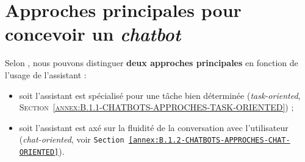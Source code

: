 	\newpage
	\section{Approches principales pour concevoir un \textit{chatbot}}
	\label{annex:B.1-ANNEXE-CHATBOTS-APPROCHES}
		
		Selon \cite{chen-etal:2017:survey-dialogue-systems}, nous pouvons distinguer \textbf{deux approches principales} en fonction de l'usage de l'assistant :
		\begin{itemize}
			\item soit l'assistant est spécialisé pour une tâche bien déterminée (\textit{task-oriented}, \textsc{Section~\ref{annex:B.1.1-CHATBOTS-APPROCHES-TASK-ORIENTED}}) ;
			\item soit l'assistant est axé sur la fluidité de la conversation avec l'utilisateur (\textit{chat-oriented}, voir \texttt{Section~\ref{annex:B.1.2-CHATBOTS-APPROCHES-CHAT-ORIENTED}}).
		\end{itemize}
		
